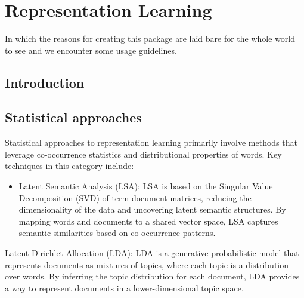 \section{Representation Learning}
\begin{center}
  \begin{minipage}{0.5\textwidth}
    \begin{small}
      In which the reasons for creating this package are laid bare for the
      whole world to see and we encounter some usage guidelines.
    \end{small}
  \end{minipage}
  \vspace{0.5cm}
\end{center}

\subsection{Introduction}


\subsection{Statistical approaches}
Statistical approaches to representation learning primarily involve methods that leverage co-occurrence statistics and distributional properties of words. Key techniques in this category include:

\begin{itemize}
  \item Latent Semantic Analysis (LSA): LSA is based on the Singular Value Decomposition (SVD) of term-document matrices, reducing the dimensionality of the data and uncovering latent semantic structures. By mapping words and documents to a shared vector space, LSA captures semantic similarities based on co-occurrence patterns.
\end{itemize}


Latent Dirichlet Allocation (LDA): LDA is a generative probabilistic model that represents documents as mixtures of topics, where each topic is a distribution over words. By inferring the topic distribution for each document, LDA provides a way to represent documents in a lower-dimensional topic space.

